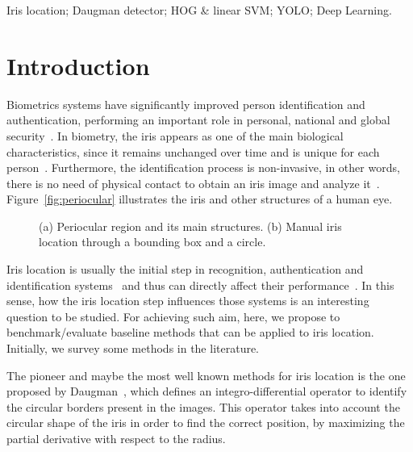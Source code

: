 \documentclass[conference]{IEEEtran}
\begin{document}
\begin{IEEEkeywords}
Iris location; Daugman detector; HOG \& linear SVM; YOLO; Deep Learning.
\end{IEEEkeywords}


\IEEEpeerreviewmaketitle


\vspace{-0.5mm}
\section{Introduction}
\label{sec:intro}

\glsresetall

Biometrics systems have significantly improved person identification and authentication, performing an important role in personal, national and global security~\cite{menotti2015deep}.
In biometry, the iris appears as one of the main biological characteristics, since it remains unchanged over time and is unique for each person~\cite{zhu2000biometric}. 
Furthermore, the identification process is non-invasive, in other words, there is no need of physical contact to obtain an iris image and analyze it~\cite{jain2006biometrics}.
Figure~\ref{fig:periocular} illustrates the iris and other structures of a human eye.


\begin{figure}[!htb]
	\vspace{-2.5mm}
	\centering
	 \hfill
	\caption{(a) Periocular region and its main structures. (b) Manual iris location through a bounding box and a circle.}
	\label{fig:eye}   
	\vspace{-3mm} 
\end{figure}

Iris location is usually the initial step in recognition, authentication and identification systems~\cite{daugman1993high} and thus can directly affect their performance~\cite{wildes1997iris,daugman2004iris}.
In this sense, how the iris location step influences those systems is an interesting question to be studied.
For achieving such aim, here, we propose to benchmark/evaluate baseline methods that can be applied to iris location.
Initially, we survey some methods in the literature.

The pioneer and maybe the most well known methods for iris location is the one proposed by Daugman~\cite{daugman2004iris}, which defines an integro-differential operator to identify the circular borders present in the images. 
This operator takes into account the circular shape of the iris in order to find the correct position, by maximizing the partial derivative with respect to the radius.
\end{document}
